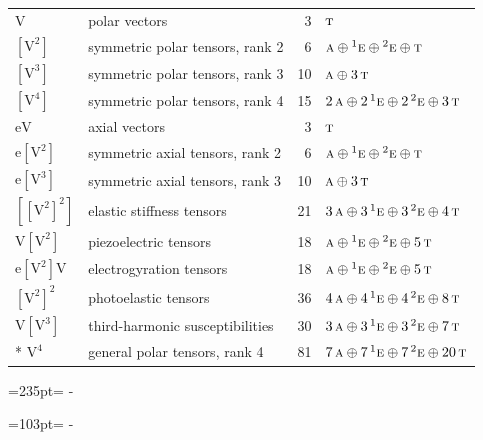 \documentclass[10pt,a4paper]{article}
\newcommand{\needspace}[1]{\par\penalty-100\begingroup\dimen0=#1\relax\dimen2=\pagegoal
  \advance\dimen2-\pagetotal\ifdim\dimen0>\dimen2\relax\ifdim\dimen2>0pt\vfil\break\fi\fi
  \endgroup}
\numberwithin{equation}{section}
\newcommand{\irr}[1]{\text{\normalfont\scshape #1}}
\newcommand{\conjpair}[1]{{}^{#1}}
\newcommand{\jahn}[1]{\mathrm{#1}}
\newlength{\fillwidth}\newlength{\cellwidth}\newlength{\colwidth}
\begin{document}
{\begin{longtable}{@{}llr>{\RaggedRight\arraybackslash}p{\fillwidth}@{}}
$\jahn{V}$ & polar vectors & 3 & $\irr{t}$\\
$\jahn{[V^{2}]}$ & symmetric polar tensors, rank 2 & 6 & $\irr{a} \oplus\allowbreak \conjpair{1}\irr{e} \oplus\allowbreak \conjpair{2}\irr{e} \oplus\allowbreak \irr{t}$\\
$\jahn{[V^{3}]}$ & symmetric polar tensors, rank 3 & 10 & $\irr{a} \oplus\allowbreak 3\,\irr{t}$\\
$\jahn{[V^{4}]}$ & symmetric polar tensors, rank 4 & 15 & $2\,\irr{a} \oplus\allowbreak 2\,\conjpair{1}\irr{e} \oplus\allowbreak 2\,\conjpair{2}\irr{e} \oplus\allowbreak 3\,\irr{t}$\\
$\jahn{eV}$ & axial vectors & 3 & $\irr{t}$\\
$\jahn{e[V^{2}]}$ & symmetric axial tensors, rank 2 & 6 & $\irr{a} \oplus\allowbreak \conjpair{1}\irr{e} \oplus\allowbreak \conjpair{2}\irr{e} \oplus\allowbreak \irr{t}$\\
$\jahn{e[V^{3}]}$ & symmetric axial tensors, rank 3 & 10 & $\irr{a} \oplus\allowbreak 3\,\irr{t}$\\
$\jahn{[[V^{2}]^{2}]}$ & elastic stiffness tensors & 21 & $3\,\irr{a} \oplus\allowbreak 3\,\conjpair{1}\irr{e} \oplus\allowbreak 3\,\conjpair{2}\irr{e} \oplus\allowbreak 4\,\irr{t}$\\
$\jahn{V[V^{2}]}$ & piezoelectric tensors & 18 & $\irr{a} \oplus\allowbreak \conjpair{1}\irr{e} \oplus\allowbreak \conjpair{2}\irr{e} \oplus\allowbreak 5\,\irr{t}$\\
$\jahn{e[V^{2}]V}$ & electrogyration tensors & 18 & $\irr{a} \oplus\allowbreak \conjpair{1}\irr{e} \oplus\allowbreak \conjpair{2}\irr{e} \oplus\allowbreak 5\,\irr{t}$\\
$\jahn{[V^{2}]^{2}}$ & photoelastic tensors & 36 & $4\,\irr{a} \oplus\allowbreak 4\,\conjpair{1}\irr{e} \oplus\allowbreak 4\,\conjpair{2}\irr{e} \oplus\allowbreak 8\,\irr{t}$\\
$\jahn{V[V^{3}]}$ & third-harmonic susceptibilities & 30 & $3\,\irr{a} \oplus\allowbreak 3\,\conjpair{1}\irr{e} \oplus\allowbreak 3\,\conjpair{2}\irr{e} \oplus\allowbreak 7\,\irr{t}$\\*
$\jahn{V^{4}}$ & general polar tensors, rank 4 & 81 & $7\,\irr{a} \oplus\allowbreak 7\,\conjpair{1}\irr{e} \oplus\allowbreak 7\,\conjpair{2}\irr{e} \oplus\allowbreak 20\,\irr{t}$\\
\bottomrule\end{longtable}}
\needspace{235pt}
\needspace{103pt}
\end{document}
